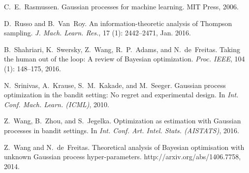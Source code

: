 \documentclass[english,onecolumn,final,11pt]{IEEEtran} %
\begin{document}
\begin{thebibliography}{23}
C.~E.~Rasmussen.
\newblock Gaussian processes for machine learning.
\newblock MIT Press, 2006.

D.~Russo and B.~Van~Roy.
\newblock An information-theoretic analysis of {T}hompson sampling.
\newblock \emph{J. Mach. Learn. Res.}, 17 (1): 2442--2471,
  Jan. 2016.

B.~Shahriari, K.~Swersky, Z.~Wang, R.~P.~Adams, and N.~de~Freitas.
\newblock Taking the human out of the loop: A review of {B}ayesian
  optimization.
\newblock \emph{Proc. IEEE}, 104 (1): 148--175, 2016.

N.~Srinivas, A.~Krause, S.~M.~Kakade, and M.~Seeger.
\newblock Gaussian process optimization in the bandit setting: No regret and
  experimental design.
\newblock In \emph{Int. Conf. Mach. Learn. (ICML)}, 2010.

Z.~Wang, B.~Zhou, and S.~Jegelka.
\newblock Optimization as estimation with {G}aussian processes in bandit
  settings.
\newblock In \emph{Int. Conf. Art. Intel. Stats. (AISTATS)}, 2016.

Z.~Wang and N.~de~Freitas.
\newblock Theoretical analysis of {B}ayesian optimisation with unknown
  {G}aussian process hyper-parameters.
\newblock http://arxiv.org/abs/1406.7758, 2014.

\end{thebibliography}
\end{document}
